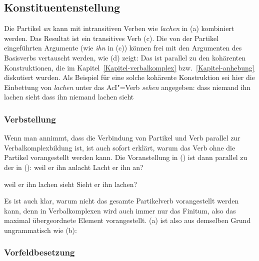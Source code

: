 \subsection{Konstituentenstellung}
\label{sec-linearization}%
\label{sec-partlinearization}
\label{sec-linearization-pv-mf}


Die Partikel \emph{an} kann mit intransitiven Verben
wie \emph{lachen} in (a) kombiniert werden. Das Resultat ist ein transitives Verb (c).
Die von der Partikel eingeführten Argumente (wie \zb \emph{ihn} in (c)) können frei
mit den Argumenten des Basisverbs vertauscht werden, wie (d) zeigt:
\eal
\label{ex-anlachen-perm-mf}
\zl
Das ist parallel zu den kohärenten Konstruktionen, die im Kapitel~\ref{Kapitel-verbalkomplex}
bzw.~\ref{Kapitel-anhebung} diskutiert wurden. Als Beispiel für eine solche kohärente Konstruktion
sei hier die Einbettung von \emph{lachen} unter das AcI"=Verb \emph{sehen} angegeben:
\eal
\ex dass niemand ihn lachen sieht
\ex dass ihn niemand lachen sieht
\zl


\subsubsection{Verbstellung}

Wenn man annimmt, dass die Verbindung von Partikel und Verb parallel zur Verbalkomplexbildung 
ist, ist auch sofort erklärt, warum das Verb ohne die Partikel vorangestellt werden kann. Die Voranstellung
in () ist dann parallel zu der in ():
\eal
\ex weil er ihn anlacht
\ex Lacht er ihn an?
\zl

\eal
\ex weil er ihn lachen sieht
\ex Sieht er ihn lachen?
\zl

\noindent
Es ist auch klar, warum nicht das gesamte Partikelverb vorangestellt werden kann,
denn in Verbalkomplexen wird auch immer nur das Finitum, also das maximal übergeordnete
Element vorangestellt. (a) ist also aus demselben Grund ungrammatisch wie (b):
\eal
{}
\zl

\subsubsection{Vorfeldbesetzung}
\label{sec-part-vorfeldbesetzung}

